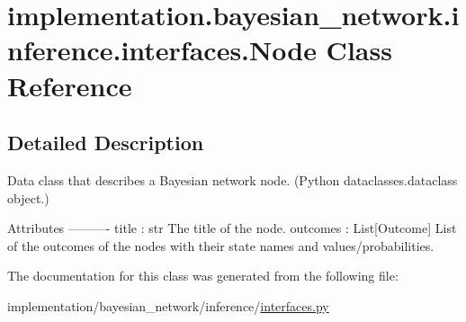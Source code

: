 \hypertarget{classimplementation_1_1bayesian__network_1_1inference_1_1interfaces_1_1_node}{}\section{implementation.\+bayesian\+\_\+network.\+inference.\+interfaces.\+Node Class Reference}
\label{classimplementation_1_1bayesian__network_1_1inference_1_1interfaces_1_1_node}


\subsection{Detailed Description}
\begin{DoxyVerb}Data class that describes a Bayesian network node.
(Python dataclasses.dataclass object.)

Attributes
----------
title : str
    The title of the node.
outcomes : List[Outcome]
    List of the outcomes of the nodes with their state names and values/probabilities.
\end{DoxyVerb}
 

The documentation for this class was generated from the following file\+:\begin{DoxyCompactItemize}
\item 
implementation/bayesian\+\_\+network/inference/\hyperlink{interfaces_8py}{interfaces.\+py}\end{DoxyCompactItemize}
